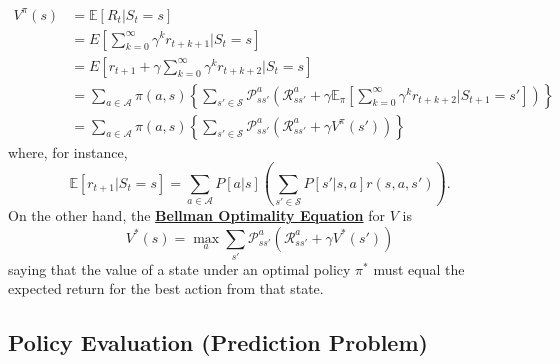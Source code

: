 \documentclass[twocolumn,landscape,10pt]{article}
\theoremstyle{definition}
\begin{document}
\begin{align*}
    V^{\pi}(s)
    &= \mathbb{E}[R_t|S_t=s] \\
    &= E\left[\sum_{k=0}^{\infty}\gamma^{k}r_{t+k+1}|S_t=s\right] \\
    &= E\left[r_{t+1}+\gamma\sum_{k=0}^{\infty}\gamma^{k}r_{t+k+2}|S_t=s\right] \\
    &=
    \sum_{a\in\mathcal{A}}\pi(a,s)\left\{\sum_{s'\in\mathcal{S}}\mathcal{P}_{ss'}^a\left(
    \mathcal{R}_{ss'}^a+\gamma\mathbb{E}_\pi\left[
\sum_{k=0}^{\infty}\gamma^{k}r_{t+k+2}|S_{t+1}=s'\right]\right)\right\} \\
    &=
    \sum_{a\in\mathcal{A}}\pi(a,s)\left\{\sum_{s'\in\mathcal{S}}\mathcal{P}_{ss'}^a\left(
    \mathcal{R}_{ss'}^a+\gamma V^\pi(s')\right)\right\}
\end{align*}
where, for instance,
\[
    \mathbb{E}[r_{t+1}|S_t=s]=\sum_{a\in\mathcal{A}}P[a|s]\left(\sum_{s'\in\mathcal{S}}P[s'|s,a]r(s,a,s')\right).
\]
On the other hand, the \textbf{\underline{Bellman Optimality Equation}} for $V$
is
\[
    V^*(s)=\underset{a}{\max}\sum_{s'}\mathcal{P}_{ss'}^a(\mathcal{R}_{ss'}^a+\gamma
    V^*(s'))
\]
saying that the value of a state under an optimal policy $\pi^*$ must equal the
expected return for the best action from that state.

\subsection{Policy Evaluation (Prediction Problem)}
\end{document}
